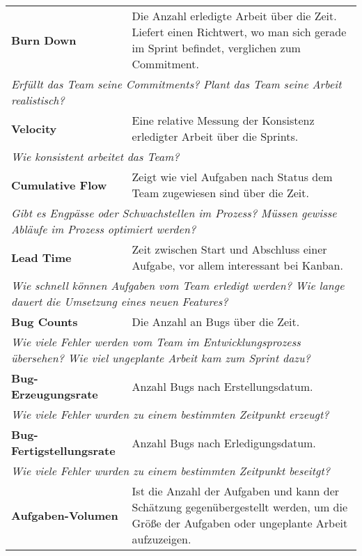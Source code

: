  \begin{table}[H]
    \centering
    \begin{tabular}{p{5cm}p{9.5cm}} \toprule
    \textbf{Burn Down} & Die Anzahl erledigte Arbeit über die Zeit. Liefert einen Richtwert, wo man sich gerade im Sprint befindet, verglichen zum Commitment. \\
    \multicolumn{2}{p{14.5cm}}{\textit{Erfüllt das Team seine Commitments? \newline Plant das Team seine Arbeit realistisch?}} \\ \midrule
    \textbf{Velocity} & Eine relative Messung der Konsistenz erledigter Arbeit über die Sprints. \\
    \multicolumn{2}{p{14.5cm}}{\textit{Wie konsistent arbeitet das Team?}} \\ \midrule
    \textbf{Cumulative Flow} & Zeigt wie viel Aufgaben nach Status dem Team zugewiesen sind über die Zeit. \\
    \multicolumn{2}{p{14.5cm}}{\textit{Gibt es Engpässe oder Schwachstellen im Prozess? \newline Müssen gewisse Abläufe im Prozess optimiert werden?}} \\ \midrule
    \textbf{Lead Time} & Zeit zwischen Start und Abschluss einer Aufgabe, vor allem interessant bei Kanban. \\
    \multicolumn{2}{p{14.5cm}}{\textit{Wie schnell können Aufgaben vom Team erledigt werden? \newline Wie lange dauert die Umsetzung eines neuen Features?}} \\ \midrule
    \textbf{Bug Counts} & Die Anzahl an Bugs über die Zeit. \\
    \multicolumn{2}{p{14.5cm}}{\textit{Wie viele Fehler werden vom Team im Entwicklungsprozess übersehen? \newline Wie viel ungeplante Arbeit kam zum Sprint dazu?}} \\ \midrule
    \textbf{Bug-Erzeugungsrate} & Anzahl Bugs nach Erstellungsdatum. \\
    \multicolumn{2}{p{14.5cm}}{\textit{Wie viele Fehler wurden zu einem bestimmten Zeitpunkt erzeugt?}} \\ \midrule
    \textbf{Bug-Fertigstellungsrate} & Anzahl Bugs nach Erledigungsdatum. \\
    \multicolumn{2}{p{14.5cm}}{\textit{Wie viele Fehler wurden zu einem bestimmten Zeitpunkt beseitgt?}} \\ \midrule
    \textbf{Aufgaben-Volumen} & Ist die Anzahl der Aufgaben und kann der Schätzung gegenübergestellt werden, um die Größe der Aufgaben oder ungeplante Arbeit aufzuzeigen. \\

\end{tabular}
\end{table}
